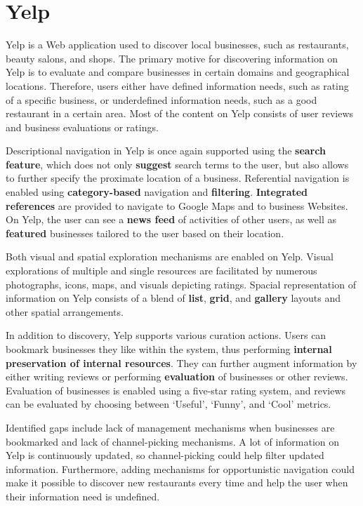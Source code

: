 {\section{Yelp}
Yelp is a Web application used to discover local businesses, such as restaurants, beauty salons, and shops. The primary motive for discovering information on Yelp is to evaluate and compare businesses in certain domains and geographical locations. Therefore, users either have defined information needs, such as rating of a specific business, or underdefined information needs, such as a good restaurant in a certain area. Most of the content on Yelp consists of user reviews and business evaluations or ratings. 

Descriptional navigation in Yelp is once again supported using the \textbf{search feature}, which does not only \textbf{suggest} search terms to the user, but also allows to further specify the proximate location of a business. Referential navigation is enabled using \textbf{category-based} navigation and \textbf{filtering}. \textbf{Integrated references} are provided to navigate to Google Maps and to business Websites.  On Yelp, the user can see a \textbf{news feed} of activities of other users, as well as \textbf{featured} businesses tailored to the user based on their location. 

Both visual and spatial exploration mechanisms are enabled on Yelp. Visual explorations of multiple and single resources are facilitated by numerous photographs, icons, maps, and visuals depicting ratings. Spacial representation of information on Yelp consists of a blend of \textbf{list}, \textbf{grid}, and \textbf{gallery} layouts and other spatial arrangements.

In addition to discovery, Yelp supports various curation actions. Users can bookmark businesses they like within the system, thus performing \textbf{internal preservation of internal resources}. They can further augment information by either writing reviews or performing \textbf{evaluation} of businesses or other reviews. Evaluation of businesses is enabled using a five-star rating system, and reviews can be evaluated by choosing between `Useful', `Funny', and `Cool' metrics. 

Identified gaps include lack of management mechanisms when businesses are bookmarked and lack of channel-picking mechanisms. A lot of information on Yelp is continuously updated, so channel-picking could help filter updated information. Furthermore, adding mechanisms for opportunistic navigation could make it possible to discover new restaurants every time and help the user when their information need is undefined.
 
} %

